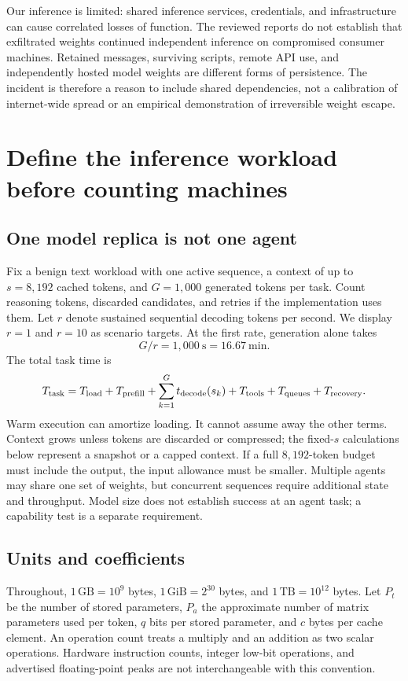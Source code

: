 \documentclass[11pt]{article}
\newcommand{\GB}{\,\mathrm{GB}}
\newcommand{\GiB}{\,\mathrm{GiB}}
\begin{document}
Our inference is limited: shared inference services, credentials, and infrastructure can cause correlated losses of function. The reviewed reports do not establish that exfiltrated weights continued independent inference on compromised consumer machines. Retained messages, surviving scripts, remote API use, and independently hosted model weights are different forms of persistence. The incident is therefore a reason to include shared dependencies, not a calibration of internet-wide spread or an empirical demonstration of irreversible weight escape.

\section{Define the inference workload before counting machines}
\subsection{One model replica is not one agent}
Fix a benign text workload with one active sequence, a context of up to $s=8{,}192$ cached tokens, and $G=1{,}000$ generated tokens per task. Count reasoning tokens, discarded candidates, and retries if the implementation uses them. Let $r$ denote sustained sequential decoding tokens per second. We display $r=1$ and $r=10$ as scenario targets. At the first rate, generation alone takes
\begin{equation}
G/r=1{,}000\ \mathrm s=16.67\ \mathrm{min}.
\end{equation}
The total task time is
\begin{equation}\label{eq:task}
T_{\rm task}=T_{\rm load}+T_{\rm prefill}+\sum_{k=1}^{G}t_{\rm decode}(s_k)
+T_{\rm tools}+T_{\rm queues}+T_{\rm recovery}.
\end{equation}
Warm execution can amortize loading. It cannot assume away the other terms. Context grows unless tokens are discarded or compressed; the fixed-$s$ calculations below represent a snapshot or a capped context. If a full $8{,}192$-token budget must include the output, the input allowance must be smaller. Multiple agents may share one set of weights, but concurrent sequences require additional state and throughput. Model size does not establish success at an agent task; a capability test is a separate requirement.

\subsection{Units and coefficients}
Throughout, $1\GB=10^9$ bytes, $1\GiB=2^{30}$ bytes, and $1\,\mathrm{TB}=10^{12}$ bytes. Let $P_t$ be the number of stored parameters, $P_a$ the approximate number of matrix parameters used per token, $q$ bits per stored parameter, and $c$ bytes per cache element. An operation count treats a multiply and an addition as two scalar operations. Hardware instruction counts, integer low-bit operations, and advertised floating-point peaks are not interchangeable with this convention.
\end{document}
